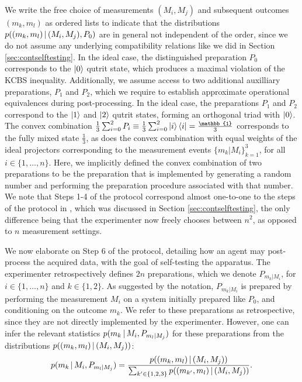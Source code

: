 We write the free choice of measurements $(M_i,M_j)$ and subsequent outcomes $(m_k,m_l)$ as ordered lists to indicate that the distributions $p((m_k,m_l)\thinspace\vert\thinspace (M_i,M_j),P_0)$ are in general not independent of the order, since we do not assume any underlying compatibility relations like we did in Section \ref{sec:contselftesting}. In the ideal case, the distinguished preparation $P_0$ corresponds to the $\ket{0}$ qutrit state, which produces a maximal violation of the KCBS inequality. Additionally, we assume access to two additional auxilliary preparations, $P_1$ and $P_2$, which we require to establish approximate operational equivalences during post-processing. In the ideal case, the preparations $P_1$ and $P_2$ correspond to the $\ket{1}$ and $\ket{2}$ qutrit states, forming an orthogonal triad with $\ket{0}$. The convex combination $\frac{1}{3}\sum_{i=0}^2 P_i\equiv\frac{1}{3}\sum_{i=0}^2\ket{i}\bra{i}=\frac{\mathbb{1}}{3}$ corresponds to the fully mixed state $\frac{\mathbb{1}}{3}$, as does the convex combination with equal weights of the ideal projectors corresponding to the measurement events $\{m_k\vert M_i\}_{k=1}^3$, for all $i\in\{1,\dots,n\}$. Here, we implicitly defined the convex combination of two preparations to be the preparation that is implemented by generating a random number and performing the preparation procedure associated with that number. We note that Steps 1-4 of the protocol correspond almost one-to-one to the steps of the protocol in \cite{Bharti2019}, which was discussed in Section \ref{sec:contselftesting}, the only difference being that the experimenter now freely chooses between $n^2$, as opposed to $n$ measurement settings.

We now elaborate on Step 6 of the protocol, detailing how an agent may post-process the acquired data, with the goal of self-testing the apparatus. The experimenter retrospectively defines $2n$ preparations, which we denote $P_{m_k\vert M_i}$, for $i\in\{1,\dots,n\}$ and $k\in\{1,2\}$. As suggested by the notation, $P_{m_k\vert M_i}$ is prepared by performing the measurement $M_i$ on a system initially prepared like $P_0$, and conditioning on the outcome $m_k$. We refer to these preparations as retrospective, since they are not directly implemented by the experimenter. However, one can infer the relevant statistics $p(m_k\thinspace\vert\thinspace M_i, P_{m_l\vert M_j})$ for these preparations from the distributions $p((m_k,m_l)\thinspace\vert\thinspace (M_i,M_j))$:
\begin{equation*}
p(m_k\thinspace\vert\thinspace M_i, P_{m_l\vert M_j})=\frac{p((m_k,m_l)\thinspace\vert\thinspace (M_i,M_j))}{\sum_{k'\in\{1,2,3\}} p((m_{k'},m_l)\thinspace\vert\thinspace (M_i,M_j))}.
\end{equation*}

